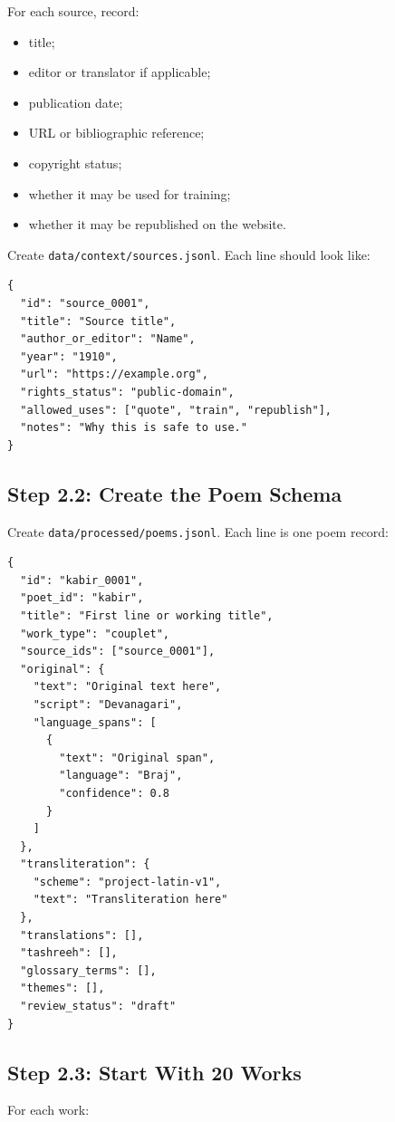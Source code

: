 \documentclass[11pt]{article}
\begin{document}
For each source, record:

\begin{itemize}
  \item title;
  \item editor or translator if applicable;
  \item publication date;
  \item URL or bibliographic reference;
  \item copyright status;
  \item whether it may be used for training;
  \item whether it may be republished on the website.
\end{itemize}

Create \verb|data/context/sources.jsonl|. Each line should look like:

\begin{verbatim}
{
  "id": "source_0001",
  "title": "Source title",
  "author_or_editor": "Name",
  "year": "1910",
  "url": "https://example.org",
  "rights_status": "public-domain",
  "allowed_uses": ["quote", "train", "republish"],
  "notes": "Why this is safe to use."
}
\end{verbatim}

\subsection{Step 2.2: Create the Poem Schema}

Create \verb|data/processed/poems.jsonl|. Each line is one poem record:

\begin{verbatim}
{
  "id": "kabir_0001",
  "poet_id": "kabir",
  "title": "First line or working title",
  "work_type": "couplet",
  "source_ids": ["source_0001"],
  "original": {
    "text": "Original text here",
    "script": "Devanagari",
    "language_spans": [
      {
        "text": "Original span",
        "language": "Braj",
        "confidence": 0.8
      }
    ]
  },
  "transliteration": {
    "scheme": "project-latin-v1",
    "text": "Transliteration here"
  },
  "translations": [],
  "tashreeh": [],
  "glossary_terms": [],
  "themes": [],
  "review_status": "draft"
}
\end{verbatim}

\subsection{Step 2.3: Start With 20 Works}

For each work:
\end{document}
